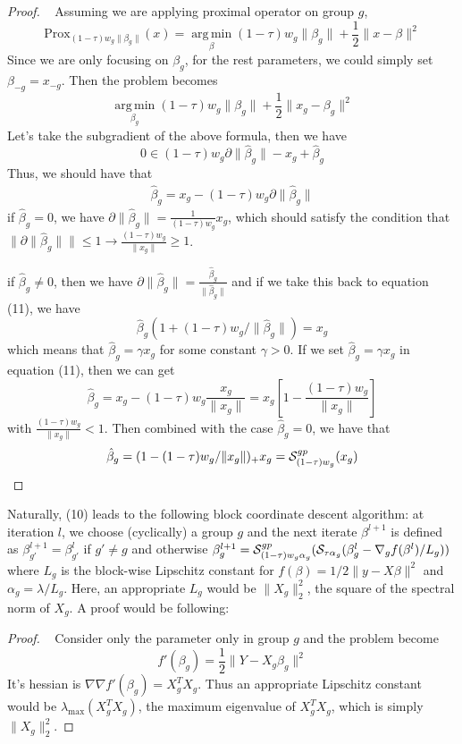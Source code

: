 \documentclass{article}
\DeclareMathOperator*{\argmin}{arg\,min}
\def\cS{{\cal S}}
\begin{document}
\begin{proof} ~\newline
 Assuming we are applying proximal operator on group $g$, 
$$
\text{Prox}_{(1-\tau)w_g\|\beta_g\|}(x) = \argmin\limits_{\beta} (1-\tau)w_g \|\beta_g\| + \frac{1}{2}\|x - \beta\|^2
$$
Since we are only focusing on $\beta_g$, for the rest parameters, we could simply set $\beta_{-g} = x_{-g}$.
Then the problem becomes
$$
\argmin\limits_{\beta_g} (1-\tau)w_g\|\beta_g\| + \frac{1}{2}\|x_g - \beta_g\|^2
$$
Let's take the subgradient of the above formula, then we have 
$$
0 \in (1-\tau)w_g \partial  \|\hat{\beta}_g\| - x_g + \hat{\beta}_g 
$$
Thus, we should have that 
\begin{align}
\hat{\beta}_g = x_g - (1-\tau)w_g \partial \|\hat{\beta}_g\|
\end{align}
if $\hat{\beta}_g = 0$, we have $\partial \|\hat{\beta}_g\| = \frac{1}{(1-\tau)w_g}x_g$, which should satisfy the condition that $\|\partial \|\hat{\beta}_g\| \| \leq 1 \rightarrow \frac{(1-\tau)w_g}{\|x_g\|} \geq 1$. 

if $\hat{\beta}_g \neq 0$, then we have $\partial \|\hat{\beta}_g\| = \frac{\hat{\beta}_g}{\|\hat{\beta}_g\|}$ and if we take this back to equation (11), we have 
$$
\hat{\beta}_g(1 + (1-\tau)w_g/\|\hat{\beta}_g\|) = x_g
$$
which means that $\hat{\beta}_g = \gamma x_g$ for some constant $\gamma > 0$.  If we set $\hat{\beta}_g = \gamma x_g$ in equation (11), then we can get 
$$
\hat{\beta}_g = x_g - (1-\tau)w_g \frac{x_g}{\|x_g\|} = x_g\left[1 - \frac{(1-\tau)w_g}{\|x_g\|}\right]
$$
with $\frac{(1-\tau)w_g}{\|x_g\|} < 1$.  Then combined with the case $\hat{\beta}_g = 0$, we have that 
$$
\hat{\beta}_g = (1 - (1-\tau)w_g/\|x_g\|)_{+} x_g = \cS^{gp}_{(1-\tau)w_g}(x_g)
$$
\end{proof}

Naturally, (10) leads to the following block coordinate descent algorithm:
at iteration $l$, we choose (cyclically) a group $g$ and the next iterate $\beta^{l+1}$ is defined as $\beta_{g'}^{l+1} = \beta_{g'}^l$ if $g' \neq g$ and otherwise $\beta_g^{l+1} = \cS^{gp}_{(1-\tau)w_g\alpha_g}(\cS_{\tau \alpha_g}(\beta_g^l - \nabla_g f(\beta^l)/L_g))$ where $L_g$ is the block-wise Lipschitz constant for $f(\beta) = 1/2\|y- X\beta\|^2$ and $\alpha_g = \lambda/L_g$.  Here, an appropriate $L_g$ would be $\|X_g\|_2^2$, the square of the spectral norm of $X_g$.  A proof would be following:
\begin{proof} ~\newline
Consider only the parameter only in group $g$ and the problem become 
$$
f'(\beta_g) = \frac{1}{2}\|Y - X_g \beta_g\|^2
$$
It's hessian is $\nabla \nabla f'(\beta_g) = X_g^T X_g$. Thus an appropriate Lipschitz constant would be $\lambda_{\text{max}}(X_g^T X_g)$, the maximum eigenvalue of $X_g^T X_g$, which is simply $\|X_g\|_2^2$.  
\end{proof}
\end{document}
